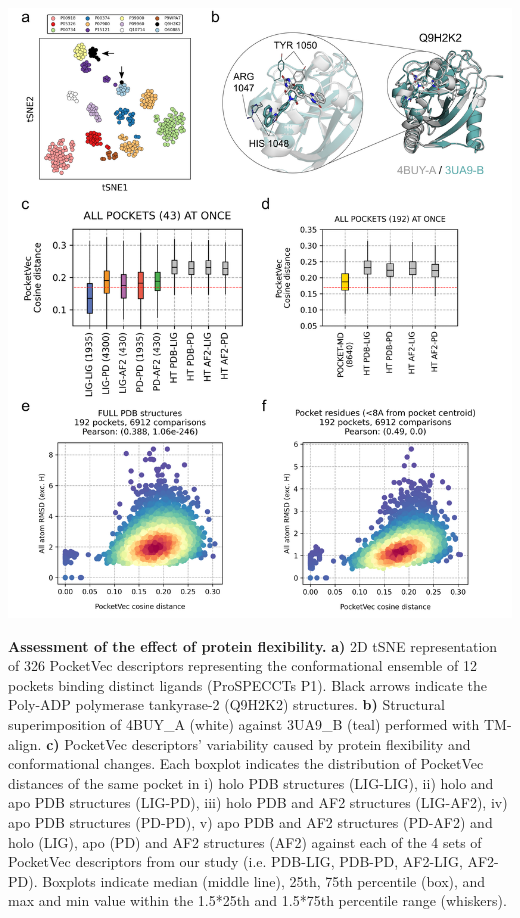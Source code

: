 

\begin{Figure_modified}
  \centering
  \includegraphics[width=\linewidth]{figures/PocketVec/Main/Fig4.png} 
  \caption{
    \textbf{Assessment of the effect of protein flexibility.} 
    \textbf{a)} 2D tSNE representation of 326 PocketVec descriptors representing the conformational ensemble of 12 pockets binding distinct ligands (ProSPECCTs P1). Black arrows indicate the Poly-ADP polymerase tankyrase-2 (Q9H2K2) structures.
    \textbf{b)} Structural superimposition of 4BUY\_A (white) against 3UA9\_B (teal) performed with TM-align\cite{zhang_tm-align_2005}.
    \textbf{c)} PocketVec descriptors’ variability caused by protein flexibility and conformational changes. Each boxplot indicates the distribution of PocketVec distances of the same pocket in i) holo PDB structures (LIG-LIG), ii) holo and apo PDB structures (LIG-PD), iii) holo PDB and AF2 structures (LIG-AF2), iv) apo PDB structures (PD-PD), v) apo PDB and AF2 structures (PD-AF2) and holo (LIG), apo (PD) and AF2 structures (AF2) against each of the 4 sets of PocketVec descriptors from our study (i.e. PDB-LIG, PDB-PD, AF2-LIG, AF2-PD). Boxplots indicate median (middle line), 25th, 75th percentile (box), and max and min value within the 1.5*25th and 1.5*75th percentile range (whiskers).
}
\end{Figure_modified}

